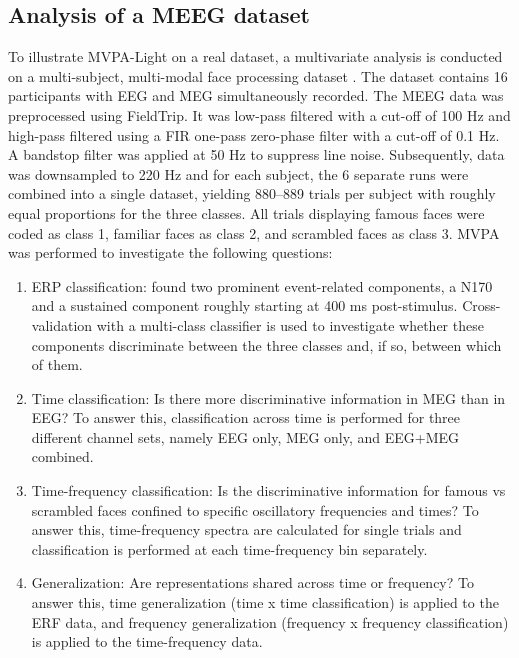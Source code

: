 \documentclass[utf8]{frontiersSCNS} %
\begin{document}
\subsection{Analysis of a MEEG dataset}

To illustrate MVPA-Light on a real dataset, a multivariate analysis is conducted on a multi-subject, multi-modal face processing dataset \citep{Wakeman2015ADataset,Wakeman2014OpenfMRI}. The dataset contains 16 participants with EEG and MEG simultaneously recorded. The MEEG data was preprocessed using FieldTrip. It was low-pass filtered with a cut-off of 100 Hz and high-pass filtered using a FIR one-pass zero-phase filter with a cut-off of 0.1 Hz. A bandstop filter was applied at 50 Hz to suppress line noise. Subsequently, data was downsampled to 220 Hz and for each subject, the 6 separate runs were combined into a single dataset, yielding 880--889 trials per subject with roughly equal proportions for the three classes. All trials displaying famous faces were coded as class 1, familiar faces as class 2, and scrambled faces as class 3. MVPA was performed to investigate the following questions:

\begin{enumerate}
    \item ERP classification: \cite{Wakeman2015ADataset} found two prominent event-related components, a N170 and a sustained component roughly starting at 400 ms post-stimulus. Cross-validation with a multi-class classifier is used to investigate whether these components discriminate between the three classes and, if so, between which of them.
    \item Time classification: Is there more discriminative information in MEG than in EEG? To answer this, classification across time is performed for three different channel sets, namely EEG only, MEG only, and EEG+MEG combined. 
    \item Time-frequency classification: Is the discriminative information for famous vs scrambled faces confined to specific oscillatory frequencies and times? To answer this, time-frequency spectra are calculated for single trials and classification is performed at each time-frequency bin separately. 
    \item Generalization: Are representations shared across time \citep{King2014} or frequency? To answer this, time generalization (time x time classification) is applied to the ERF data, and frequency generalization (frequency x frequency classification) is applied to the time-frequency data.
\end{enumerate}
\end{document}
